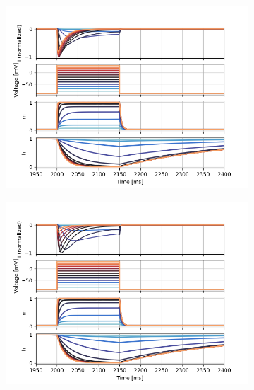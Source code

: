 \documentclass[../main.tex]{subfiles}
\begin{document}
\begin{figure}[!t]
    \centering
    \begin{subfigure}[t]{0.45\textwidth}
        \centering
        \includegraphics[width=\textwidth]{../../reports/workflow/img/t_type_calcium_channel/simulations/No Scale/Ohm's LawVoltage Step Up-Down6_voltage_traces.png}
        \caption{}
        \label{fig_t_type_ohmic_voltage_traces}
    \end{subfigure}
    \hfill
    \begin{subfigure}[t]{0.45\textwidth}
        \centering
        \includegraphics[width=\textwidth]{../../reports/workflow/img/t_type_calcium_channel/simulations/No Scale/Constant Field EquationVoltage Step Up-Down6_voltage_traces.png}
        \caption{}
        \label{fig_t_type_constant_field_voltage_traces}
    \end{subfigure}


\end{figure}
\end{document}
